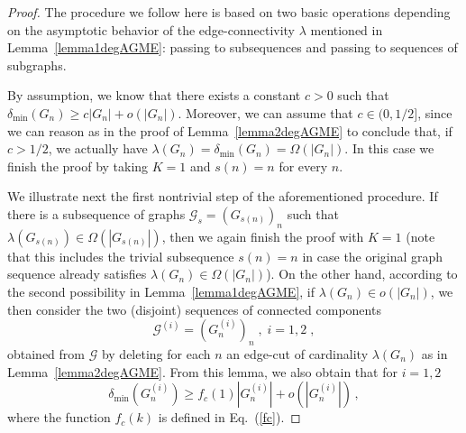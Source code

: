 \documentclass[a4paper,onecolumn,accepted=2024-12-14]{quantumarticle}
\theoremstyle{plain}
\newcommand{\cG}{{\mathcal G}}         %
\begin{document}
\begin{proof}
The procedure we follow here is based on two basic operations depending on the asymptotic behavior of the edge-connectivity $\lambda$ mentioned in Lemma~\ref{lemma1degAGME}:
passing to subsequences and passing to sequences of subgraphs.

By assumption, we know that there exists a constant $c > 0$ such that
$\delta_{\mathrm{min}}(G_n)\geq c|G_n|+ o(|G_n|)$. Moreover, we can assume that $c\in (0,1/2]$, since we can reason as in the proof of Lemma~\ref{lemma2degAGME} to conclude that, if $c>1/2$, we actually have
$\lambda(G_n)=\delta_{\mathrm{min}}(G_n)=\Omega(|G_n|)$. In this case we finish the proof by taking $K=1$ and $s(n)=n$ for every $n$.

We illustrate next the first nontrivial step of the aforementioned procedure.
If there is a subsequence of graphs $\cG_s = (G_{s(n)})_n$ such that
$\lambda(G_{s(n)}) \in\Omega(|G_{s(n)}|)$, then we again finish the proof with $K = 1$ (note that this includes the trivial subsequence $s(n) = n$ in case the original graph sequence already satisfies $\lambda(G_n) \in\Omega(|G_n|)$). On the other hand, according to
the second possibility in Lemma~\ref{lemma1degAGME}, if $\lambda(G_n)\in o(|G_n|)$, we then consider the two (disjoint) sequences of connected components
\begin{equation}
\cG^{(i)}=\left(G^{(i)}_n\right)_n \;, \;i=1,2\;,
\end{equation}
obtained from $\cG$ by deleting for each $n$ an edge-cut of cardinality
$\lambda(G_n)$ as in Lemma~\ref{lemma2degAGME}. From this lemma, we also obtain that
for $i=1,2$
\begin{equation}\label{prop651}
 \delta_{\mathrm{min}}(G_n^{(i)})\geq f_c(1) |G_n^{(i)}|+o\left(|G_n^{(i)}|\right)\,,
\end{equation}
where the function $f_c(k)$ is defined in Eq.~(\ref{fc}).


\end{proof}
\end{document}
